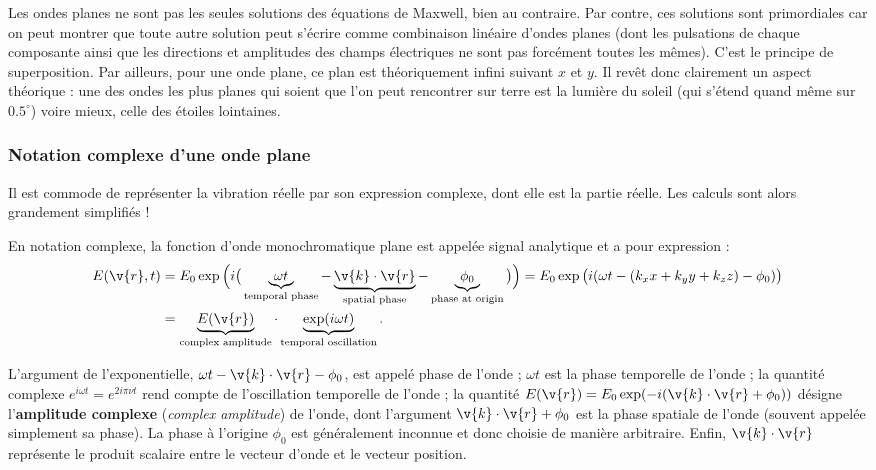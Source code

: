 \begin{remark}[Superposition]
  Les ondes planes ne sont pas les seules solutions des équations de Maxwell,
  bien au contraire. Par contre, ces solutions sont primordiales car on peut
  montrer que toute autre solution peut s'écrire comme combinaison linéaire
  d'ondes planes (dont les pulsations de chaque composante ainsi que les
  directions et amplitudes des champs électriques ne sont pas forcément toutes
  les mêmes). C'est le principe de superposition. Par ailleurs, pour une onde
  plane, ce plan est théoriquement infini suivant $x$ et $y$. Il revêt donc
  clairement un aspect théorique : une des ondes les plus planes qui soient que
  l'on peut rencontrer sur terre est la lumière du soleil (qui s'étend quand
  même sur $0.5^\circ$) voire mieux, celle des étoiles lointaines.
\end{remark}

\subsubsection{Notation complexe d'une onde plane}

Il est commode de représenter la vibration réelle par son expression complexe,
dont elle est la partie réelle. Les calculs sont alors grandement simplifiés !

\begin{definition}
  En notation complexe, la fonction d'onde monochromatique plane est appelée
  signal analytique et a pour expression :
  \begin{align*}
    E(\v{r},t)&=E_0\exp\Big(i\big(\underbrace{\omega t}_{\text{temporal phase}}
      -\underbrace{\v{k}\cdot\v{r}}_{\text{spatial phase}}
      -\underbrace{\phi_0}_{\text{phase at origin}}\big)\Big)
    =E_0\exp\big(i(\omega t-(k_xx+k_yy+k_zz)-\phi_0)\big)\\
    &=\underbrace{E(\v{r})}_{\text{complex amplitude}}\cdot
      \underbrace{\exp(i\omega t)}_{\text{temporal oscillation}} .
  \end{align*}
\end{definition}

L'argument de l'exponentielle, $\omega t-\v{k}\cdot\v{r}-\phi_0$, est appelé
phase de l'onde ; $\omega t$ est la phase temporelle de l'onde ; la quantité
complexe $e^{i\omega t}=e^{2i\pi\nu t}$ rend compte de l'oscillation temporelle
de l'onde ; la quantité $E(\v{r})=E_0\exp(-i(\v{k}\cdot\v{r}+\phi_0))$ désigne
l'\textbf{amplitude complexe} (\textit{complex amplitude}) de l'onde, dont
l'argument $\v{k}\cdot\v{r}+\phi_0$ est la phase spatiale de l'onde (souvent
appelée simplement sa phase). La phase à l'origine $\phi_0$ est généralement
inconnue et donc choisie de manière arbitraire. Enfin, $\v{k}\cdot\v{r}$
représente le produit scalaire entre le vecteur d'onde et le vecteur position.

